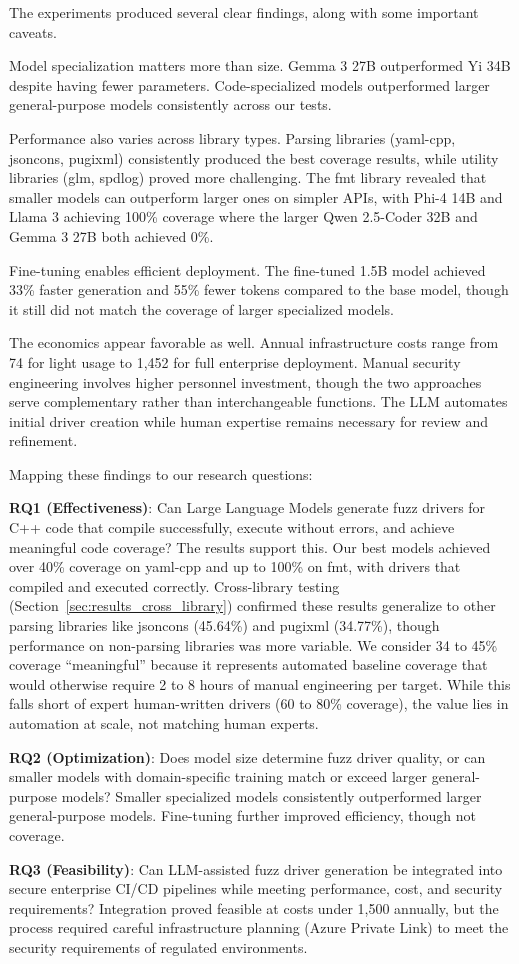 The experiments produced several clear findings, along with some important caveats.

Model specialization matters more than size. Gemma 3 27B outperformed Yi 34B despite having fewer parameters. Code-specialized models outperformed larger general-purpose models consistently across our tests.

Performance also varies across library types. Parsing libraries (yaml-cpp, jsoncons, pugixml) consistently produced the best coverage results, while utility libraries (glm, spdlog) proved more challenging. The fmt library revealed that smaller models can outperform larger ones on simpler APIs, with Phi-4 14B and Llama 3 achieving 100\% coverage where the larger Qwen 2.5-Coder 32B and Gemma 3 27B both achieved 0\%.

Fine-tuning enables efficient deployment. The fine-tuned 1.5B model achieved 33\% faster generation and 55\% fewer tokens compared to the base model, though it still did not match the coverage of larger specialized models.

The economics appear favorable as well. Annual infrastructure costs range from \texteuro{}74 for light usage to \texteuro{}1,452 for full enterprise deployment. Manual security engineering involves higher personnel investment, though the two approaches serve complementary rather than interchangeable functions. The LLM automates initial driver creation while human expertise remains necessary for review and refinement.

Mapping these findings to our research questions:

\textbf{RQ1 (Effectiveness)}: Can Large Language Models generate fuzz drivers for C++ code that compile successfully, execute without errors, and achieve meaningful code coverage? The results support this. Our best models achieved over 40\% coverage on yaml-cpp and up to 100\% on fmt, with drivers that compiled and executed correctly. Cross-library testing (Section~\ref{sec:results_cross_library}) confirmed these results generalize to other parsing libraries like jsoncons (45.64\%) and pugixml (34.77\%), though performance on non-parsing libraries was more variable. We consider 34 to 45\% coverage ``meaningful'' because it represents automated baseline coverage that would otherwise require 2 to 8 hours of manual engineering per target. While this falls short of expert human-written drivers (60 to 80\% coverage), the value lies in automation at scale, not matching human experts.

\textbf{RQ2 (Optimization)}: Does model size determine fuzz driver quality, or can smaller models with domain-specific training match or exceed larger general-purpose models? Smaller specialized models consistently outperformed larger general-purpose models. Fine-tuning further improved efficiency, though not coverage.

\textbf{RQ3 (Feasibility)}: Can LLM-assisted fuzz driver generation be integrated into secure enterprise CI/CD pipelines while meeting performance, cost, and security requirements? Integration proved feasible at costs under \texteuro{}1,500 annually, but the process required careful infrastructure planning (Azure Private Link) to meet the security requirements of regulated environments.
